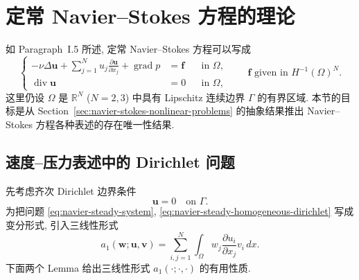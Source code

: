 \section{定常 Navier--Stokes 方程的理论}
\label{sec:navier-stokes-steady-theory}
\setcounter{equation}{0}

如 Paragraph~I.5 所述, 定常 Navier--Stokes 方程可以写成
\begin{equation}\label{eq:navier-steady-system}
\left\{
\begin{aligned}
-\nu\Delta\mathbf u
+\sum_{j=1}^{N}u_j\frac{\partial\mathbf u}{\partial x_j}
+\operatorname{grad}p&=\mathbf f&&\text{in }\Omega,\\
\operatorname{div}\mathbf u&=0&&\text{in }\Omega,
\end{aligned}
\right.
\qquad
\mathbf f\text{ given in }H^{-1}(\Omega)^N.
\end{equation}
这里仍设 $\Omega$ 是 $\mathbb R^N$ ($N=2,3$) 中具有 Lipschitz 连续边界
$\Gamma$ 的有界区域. 本节的目标是从 Section~\ref{sec:navier-stokes-nonlinear-problems}
的抽象结果推出 Navier--Stokes 方程各种表述的存在唯一性结果.

\subsection{速度--压力表述中的 Dirichlet 问题}
\label{subsec:navier-steady-velocity-pressure}

先考虑齐次 Dirichlet 边界条件
\begin{equation}\label{eq:navier-steady-homogeneous-dirichlet}
\mathbf u=0\quad\text{on }\Gamma.
\end{equation}
为把问题 \eqref{eq:navier-steady-system},
\eqref{eq:navier-steady-homogeneous-dirichlet} 写成变分形式, 引入三线性形式
\begin{equation}\label{eq:navier-steady-convection-form}
a_1(\mathbf w;\mathbf u,\mathbf v)
=\sum_{i,j=1}^{N}\int_\Omega
w_j\frac{\partial u_i}{\partial x_j}v_i\,dx.
\end{equation}
下面两个 Lemma 给出三线性形式 $a_1(\cdot;\cdot,\cdot)$ 的有用性质.

